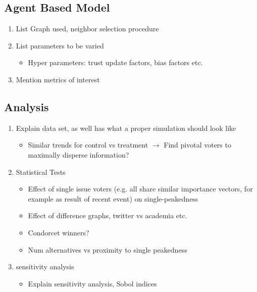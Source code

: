 \subsection{Agent Based Model}
\begin{enumerate}
	\item List Graph used, neighbor selection procedure
	\item List parameters to be varied
		\begin{itemize}
			\item Hyper parameters: trust update factors, bias factors etc.
		\end{itemize}
	\item Mention metrics of interest
	\end{enumerate}
\subsection{Analysis}
\begin{enumerate}
	\item Explain data set, as well has what a proper simulation should look like
		\begin{itemize}
			\item Similar trends for control vs treatment $\to$ Find pivotal voters to maximally disperse information?
		\end{itemize}

	\item Statistical Tests

		\begin{itemize}
			\item Effect of single issue voters (e.g. all share similar importance vectors, for example as result of recent event) on single-peakedness 
			\item Effect of difference graphs, twitter vs academia etc. 
			\item Condorcet winners? 
			\item Num alternatives vs proximity to single peakedness
		\end{itemize}
	\item sensitivity analysis
		\begin{itemize}
			\item Explain sensitivity analysis, Sobol indices
		\end{itemize}
\end{enumerate}

